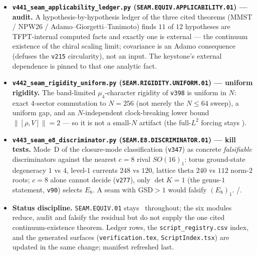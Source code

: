 \begin{itemize}
$C_\beta{=}1/(1{+}e^{\beta K})$ from the NPW26-proven \emph{trace} state ($\beta{=}0$) to the seam KMS state
($\beta{=}1$) every covariance is reflection-related, $\mu_4$-invariant and valid --- a norm-continuous,
obstruction-free homotopy, upgrading the single point of \texttt{v426} to a path argument for sub-step~(ii) of
\texttt{v424}.
\item \textbf{\texttt{v441\_seam\_applicability\_ledger.py} (\texttt{SEAM.EQUIV.APPLICABILITY.01}) --- audit.}
A hypothesis-by-hypothesis ledger of the three cited theorems (MMST / NPW26 / Adamo--Giorgetti--Tanimoto) finds
$11$ of $12$ hypotheses are TFPT-internal computed facts and exactly one is external --- the continuum existence of
the chiral scaling limit; covariance is an Adamo consequence (defuses the \texttt{v215} circularity), not an input.
The keystone's external dependence is pinned to that one analytic fact.
\item \textbf{\texttt{v442\_seam\_rigidity\_uniform.py} (\texttt{SEAM.RIGIDITY.UNIFORM.01}) --- uniform rigidity.}
The band-limited $\mu_4$-character rigidity of \texttt{v398} is uniform in $N$: exact $4$-sector commutation to
$N{=}256$ (not merely the $N\le64$ sweep), a uniform gap, and an $N$-independent clock-breaking lower bound
$\|[\rho,V]\|{=}2$ --- so it is not a small-$N$ artifact (the full-$L^2$ forcing stays \mO).
\item \textbf{\texttt{v443\_seam\_e8\_discriminator.py} (\texttt{SEAM.E8.DISCRIMINATOR.01}) --- kill tests.}
Mode~D of the closure-mode classification (\texttt{v347}) as concrete \emph{falsifiable} discriminators against the
nearest $c{=}8$ rival $SO(16)_1$: torus ground-state degeneracy $1$ vs $4$, level-$1$ currents $248$ vs $120$,
lattice theta $240$ vs $112$ norm-$2$ roots; $c{=}8$ alone cannot decide (\texttt{v277}), only $\det K{=}1$ (the
genus-$1$ statement, \texttt{v90}) selects $E_8$. A seam with GSD${>}1$ would falsify $(E_8)_1$. \mX/\mC.
\item \textbf{Status discipline.} \texttt{SEAM.EQUIV.01} stays \mO\ throughout; the six modules reduce, audit and
falsify the residual but do not supply the one cited continuum-existence theorem. Ledger rows, the
\texttt{script\_registry.csv} index, and the generated surfaces (\texttt{verification.tex},
\texttt{ScriptIndex.tsx}) are updated in the same change; manifest refreshed last.
\end{itemize}

